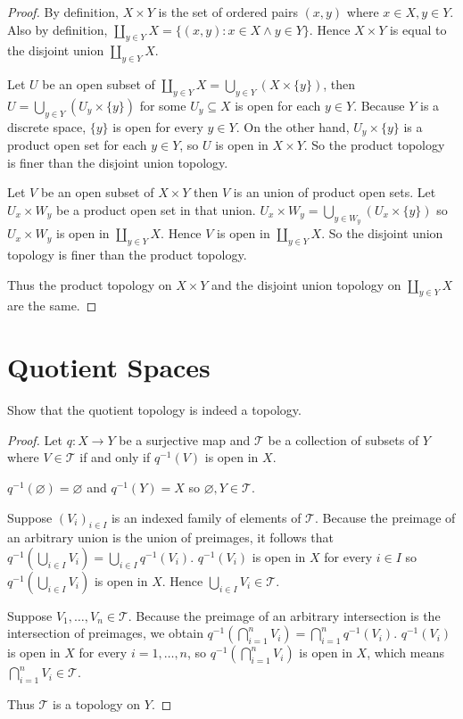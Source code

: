 \begin{proof}
	By definition, $X\times Y$ is the set of ordered pairs $(x, y)$ where $x\in X, y\in Y$. Also by definition, $\coprod_{y\in Y}X = \{ (x, y): x\in X \land y\in Y \}$. Hence $X\times Y$ is equal to the disjoint union $\coprod_{y\in Y}X$.

	Let $U$ be an open subset of $\coprod_{y\in Y}X = \bigcup_{y\in Y}(X\times\{y\})$, then $U = \bigcup_{y\in Y}(U_{y}\times \{ y \})$ for some $U_{y}\subseteq X$ is open for each $y\in Y$. Because $Y$ is a discrete space, $\{y\}$ is open for every $y\in Y$. On the other hand, $U_{y}\times\{y\}$ is a product open set for each $y\in Y$, so $U$ is open in $X\times Y$. So the product topology is finer than the disjoint union topology.

	Let $V$ be an open subset of $X\times Y$ then $V$ is an union of product open sets. Let $U_{x}\times W_{y}$ be a product open set in that union. $U_{x}\times W_{y} = \bigcup_{y\in W_{y}}(U_{x}\times\{y\})$ so $U_{x}\times W_{y}$ is open in $\coprod_{y\in Y}X$. Hence $V$ is open in $\coprod_{y\in Y}X$. So the disjoint union topology is finer than the product topology.

	Thus the product topology on $X\times Y$ and the disjoint union topology on $\coprod_{y\in Y}X$ are the same.
\end{proof}

\section*{Quotient Spaces}

\begin{exercise}{3.46}
	Show that the quotient topology is indeed a topology.
\end{exercise}

\begin{proof}
	Let $q: X\to Y$ be a surjective map and $\mathscr{T}$ be a collection of subsets of $Y$ where $V\in\mathscr{T}$ if and only if $q^{-1}(V)$ is open in $X$.

	$q^{-1}(\varnothing) = \varnothing$ and $q^{-1}(Y) = X$ so $\varnothing, Y\in\mathscr{T}$.

	Suppose ${(V_{i})}_{i\in I}$ is an indexed family of elements of $\mathscr{T}$. Because the preimage of an arbitrary union is the union of preimages, it follows that $q^{-1}\left(\bigcup_{i\in I}V_{i}\right) = \bigcup_{i\in I}q^{-1}(V_{i})$. $q^{-1}(V_{i})$ is open in $X$ for every $i\in I$ so $q^{-1}\left(\bigcup_{i\in I}V_{i}\right)$ is open in $X$. Hence $\bigcup_{i\in I}V_{i}\in \mathscr{T}$.

	Suppose $V_{1}, \ldots, V_{n}\in \mathscr{T}$. Because the preimage of an arbitrary intersection is the intersection of preimages, we obtain $q^{-1}\left(\bigcap^{n}_{i=1}V_{i}\right) = \bigcap^{n}_{i=1}q^{-1}(V_{i})$. $q^{-1}(V_{i})$ is open in $X$ for every $i=1,\ldots,n$, so $q^{-1}\left(\bigcap^{n}_{i=1}V_{i}\right)$ is open in $X$, which means $\bigcap^{n}_{i=1}V_{i}\in\mathscr{T}$.

	Thus $\mathscr{T}$ is a topology on $Y$.
\end{proof}

